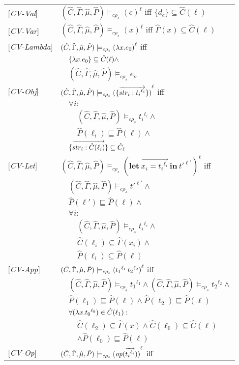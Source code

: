 \documentclass[[12pt,a4paper,twoside,openrigh]{article}
\newcommand{\Cat}[0]{\hat{C}}
\newcommand{\muat}[0]{\hat{\mu}}
\newcommand{\Env}[0]{\hat{\Gamma}}
\newcommand{\Pat}[0]{\hat{P}}
\newcommand{\cenvs}{(\Cat,\Env,\muat,\Pat)}
\newcommand{\ccest}[1]{\cenvs \models_{c \rho_s} #1}
\newcommand{\ccestl}[1]{\cenvs \models_{c \rho_s} {(#1)}^{\ell}}
\newcommand{\lbt}[1]{{t_#1}^{\ell_#1}}
\newcommand{\letexprs}[3]{\mathbf{let}\ \vec{#1 = #2}\ \mathbf{in}\ #3}
\begin{document}
\begin{tabular}{l l l l}
{[\textit{CV-Val}]}&\multicolumn{3}{l}{$ \ccestl {c} $ iff $\{d_c\} \subseteq \Cat(\ell)$} \\ 
{[\textit{CV-Var}]}&\multicolumn{3}{l}{$ \ccestl {x} $ iff $\Env(x) \subseteq \Cat(\ell)$} \\ 
{[\textit{CV-Lambda}]}&\multicolumn{3}{l}{$ \ccestl {\lam{x}{e_0}} $ iff}\\
&&\multicolumn{2}{l}{$\{\lam{x}{e_0}\} \subseteq \Cat(\ell) \wedge $}\\
&&\multicolumn{2}{l}{$ \ccest {e_o}$}\\
{[\textit{CV-Obj}]}&\multicolumn{3}{l}{$ \ccestl {\rec{\vec{str_i : \lbt i}}}$ iff}\\
&&\multicolumn{2}{l}{$\forall i:$}\\
&&&$\ccest {\lbt i} \wedge$\\
&&&$\Pat(\ell_i) \sqsubseteq \Pat(\ell) \wedge$\\ 
&&\multicolumn{2}{l}{$\rec{\vec{str_i : \Cat(\ell_i)}} \subseteq \Cat_\ell $} \\
{[\textit{CV-Let}]}&\multicolumn{3}{l}{$ \ccestl {\letexprs{x_i}{\lbt i}{{t'}^{\ell'}}}$ iff}\\
&&\multicolumn{2}{l}{$ \ccest {{t'}^{\ell'}} \wedge$} \\
&&\multicolumn{2}{l}{$ \Pat(\ell') \sqsubseteq \Pat(\ell) \wedge$}\\
&&\multicolumn{2}{l}{$ \forall i:$}\\
&&&$\ccest {{t_i}^{\ell_i}} \wedge$ \\
&&& $ \Cat(\ell_i) \subseteq \Env(x_i) \wedge$ \\
&&& $ \Pat(\ell_i) \subseteq \Pat(\ell) $ \\
{[\textit{CV-App}]}&\multicolumn{3}{l}{$ \ccestl {\appl {\lbt 1} {\lbt 2}}$ iff}\\
&&\multicolumn{2}{l}{$\ccest {\lbt 1} \wedge \ccest {\lbt 2} \wedge$} \\
&&\multicolumn{2}{l}{$\Pat(\ell_1) \sqsubseteq \Pat(\ell) \wedge \Pat(\ell_2) \sqsubseteq \Pat(\ell)$} \\
&&\multicolumn{2}{l}{$\forall (\lam{x}{\lbt 0}) \in \Cat(\ell_1) :$}\\
&&&$\Cat(\ell_2) \subseteq \Env(x) \wedge \Cat(\ell_0) \subseteq \Cat(\ell)$\\
&&&$\wedge \Pat(\ell_0) \sqsubseteq \Pat(\ell) $\\
{[\textit{CV-Op}]}&\multicolumn{3}{l}{$ \ccestl {\op (\vec{\lbt i})} $ iff}\\

\end{tabular}
\end{document}
